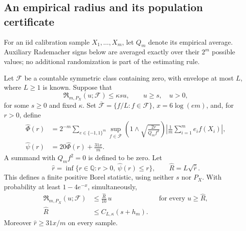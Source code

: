 \subsection{An empirical radius and its population certificate}
\label{app:stochastic-calibration}

For an iid calibration sample $X_1,\ldots,X_m$, let $Q_m$ denote
its empirical average. Auxiliary Rademacher signs below are averaged
exactly over their $2^m$ possible values; no additional randomization
is part of the estimating rule.

\begin{lemma}
\label{lem:stochastic-empirical-radius}
Let $\mathcal F$ be a countable symmetric class containing zero,
with envelope at most $L$, where $L\ge1$ is known. Suppose that
\begin{equation}
 \mathfrak R_{m,P_X}(u;\mathcal F)
 \le\kappa su,\qquad u\ge s,\quad u>0,
 \label{eq:stochastic-core-input}
\end{equation}
for some $s\ge0$ and fixed $\kappa$. Set
$\overline{\mathcal F}=\{f/L:f\in\mathcal F\}$,
$x=6\log(em)$, and, for $r>0$, define
\begin{align}
 \widehat\Phi(r)
 &=2^{-m}\sum_{e\in\{-1,1\}^m}
 \sup_{f\in\overline{\mathcal F}}
 \left(1\wedge\sqrt{\frac{2r}{Q_mf^2}}\right)
 \left|\frac1m\sum_{i=1}^m e_if(X_i)\right|,
 \label{eq:stochastic-empirical-phi}\\
 \widehat\psi(r)&=20\widehat\Phi(r)+\frac{31x}{m}.
 \label{eq:stochastic-empirical-psi}
\end{align}
A summand with $Q_mf^2=0$ is defined to be zero. Let
\begin{equation}
 \widehat r
 =\inf\{r\in\mathbb Q:r>0,\ \widehat\psi(r)\le r\},
 \qquad \widehat R=L\sqrt{\widehat r}.
 \label{eq:stochastic-radius-rule}
\end{equation}
This defines a finite positive Borel statistic, using neither $s$ nor
$P_X$. With probability at least $1-4e^{-x}$, simultaneously,
\begin{align}
 \mathfrak R_{m,P_X}(u;\mathcal F)
 &\le\frac{\widehat R}{10}\,u
 &&\text{for every }u\ge\widehat R,
 \label{eq:stochastic-radius-certificate}\\
 \widehat R&\le C_{L,\kappa}(s+h_m).
 \label{eq:stochastic-radius-size}
\end{align}
Moreover $\widehat r\ge31x/m$ on every sample.
\end{lemma}
